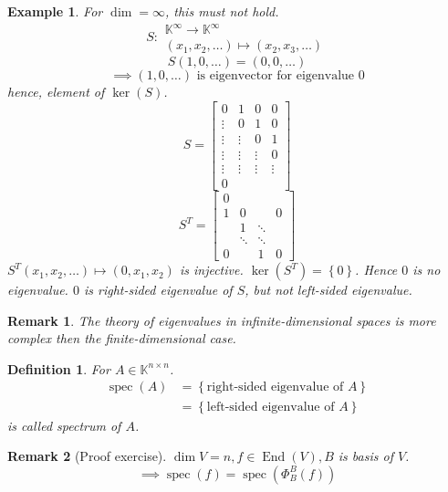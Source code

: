 \documentclass{article}
\newtheorem{example}{Example}  \numberwithin{example}{section}
\newtheorem{definition}{Definition}  \numberwithin{definition}{section}
\newtheorem{remark}{Remark}  \numberwithin{remark}{section}
\newcommand{\set}[1]{\left\{#1\right\}}
\begin{document}
\begin{example} %
  For $\dim = \infty$, this must not hold.
  \[ S: \substack{\mathbb K^\infty \to \mathbb K^\infty \\ (x_1, x_2, \dots) \mapsto (x_2, x_3, \dots)} \]
  \[ S(1, 0, \dots) = (0, 0, \dots) \]
  \[ \implies (1, 0, \dots) \text{ is eigenvector for eigenvalue } 0 \]
  hence, element of $\ker(S)$.
  \[
    S = \begin{bmatrix}
      0 & 1 & 0 & 0 \\
      \vdots & 0 & 1 & 0 \\
      \vdots & \vdots & 0 & 1 \\
      \vdots & \vdots & \vdots & 0 \\
      \vdots & \vdots & \vdots & \vdots \\
      0 & & &
    \end{bmatrix}
  \] \[
    S^T = \begin{bmatrix}
      0 & & & \\
      1 & 0 &  & 0 \\
        & 1 & \ddots & \\
        & \ddots & \ddots & \\
      0 &  & 1 & 0
    \end{bmatrix}
  \]
  $S^T(x_1, x_2, \dots) \mapsto (0, x_1, x_2)$ is injective.
  $\ker(S^T) = \set{0}$. Hence $0$ is no eigenvalue.
  $0$ is right-sided eigenvalue of $S$, but not left-sided eigenvalue.
\end{example}

\begin{remark}
  The theory of eigenvalues in infinite-dimensional spaces is more complex then the finite-dimensional case.
\end{remark}

\begin{definition} %
  For $A \in \mathbb K^{n \times n}$.
  \begin{align*}
    \operatorname{spec}(A) &= \set{\text{right-sided eigenvalue of } A} \\
        &= \set{\text{left-sided eigenvalue of } A}
  \end{align*}
  is called \emph{spectrum of $A$}.
\end{definition}

\begin{remark}[Proof exercise]
  $\dim{V} = n, f \in \operatorname{End}(V), B$ is basis of $V$.
  \[ \implies \operatorname{spec}(f) = \operatorname{spec}(\Phi_B^B(f)) \]
\end{remark}
\end{document}
